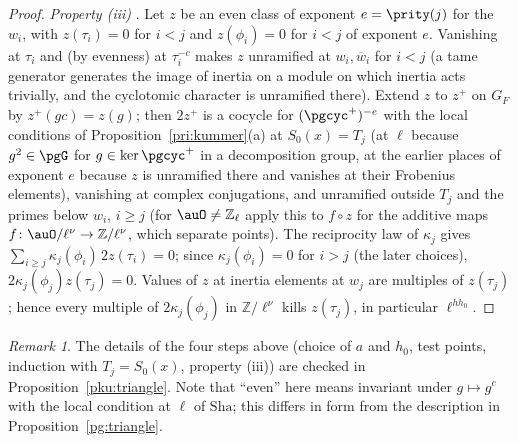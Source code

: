 \documentclass[10pt]{amsart}
\theoremstyle{definition}
\theoremstyle{remark}
\newtheorem{remark}[theorem]{Remark}
\newcommand{\Z}{\mathbb Z}
\begin{document}
\begin{proof}
\emph{Property (iii)} . Let $z$ be an even class of exponent $e=\prity(j)$ for the $w_i$,
with $z(\tau_i)=0$ for $i<j$ and $z(\phi_i)=0$ for $i<j$ of exponent $e$. Vanishing at $\tau_i$ and
(by evenness) at $\tau_i^{-c}$ makes $z$ unramified at $w_i,\overline w_i$ for $i<j$ (a tame
generator generates the image of inertia on a module on which inertia acts trivially, and the
cyclotomic character is unramified there). Extend $z$ to $z^+$ on $G_F$ by $z^+(gc)=z(g)$; then
$2z^+$ is a cocycle for $(\pgcyc^+)^{-e}$ with the local conditions of
Proposition~\ref{pri:kummer}(a) at $S_0(x)=T_j$ (at $\ell$ because $g^2\in\pgG$ for $g\in\ker\pgcyc^+$
in a decomposition group, at the earlier places of exponent $e$ because $z$ is unramified there and
vanishes at their Frobenius elements), vanishing at complex conjugations, and unramified outside
$T_j$ and the primes below $w_i$, $i\ge j$ (for $\auO\ne\Z_\ell$ apply this to $f\circ z$ for the
additive maps $f\colon\auO/\ell^\nu\to\Z/\ell^\nu$, which separate points). The reciprocity law of $\kappa_j$ gives $\sum_{i\ge j}\kappa_j(\phi_i)\,
2z(\tau_i)=0$; since $\kappa_j(\phi_i)=0$ for $i>j$ (the later choices), $2\kappa_j(\phi_j)z(
\tau_j)=0$. Values of $z$ at inertia elements at $w_j$ are multiples of $z(\tau_j)$; hence every
multiple of $2\kappa_j(\phi_j)$ in $\Z/\ell^\nu$ kills $z(\tau_j)$, in particular $\ell^{hh_0}$.
\end{proof}

\begin{remark}
The details of the four steps above (choice of $a$ and $h_0$, test points, induction with
$T_j=S_0(x)$, property (iii)) are checked in Proposition~\ref{pku:triangle}. Note that ``even'' here
means invariant under $g\mapsto g^c$ with the local condition at $\ell$ of $\mathrm{Sha}$; this
differs in form from the description in Proposition~\ref{pg:triangle}.
\end{remark}
\end{document}

